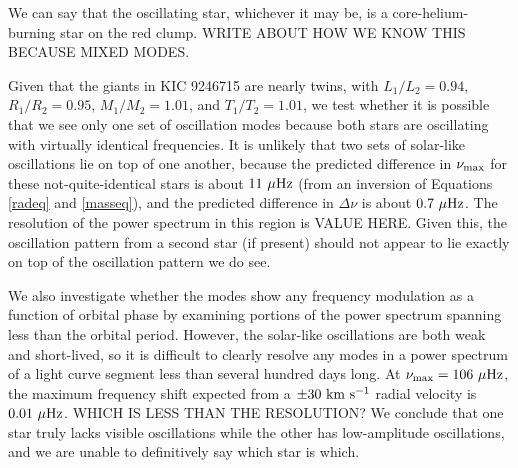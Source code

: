 We can say that the oscillating star, whichever it may be, is a core-helium-burning star on the red clump. WRITE ABOUT HOW WE KNOW THIS BECAUSE MIXED MODES. 

Given that the giants in KIC 9246715 are nearly twins, with $L_1/L_2 = 0.94$, $R_1/R_2 = 0.95$, $M_1/M_2 = 1.01$, and $T_1/T_2 = 1.01$, we test whether it is possible that we see only one set of oscillation modes because both stars are oscillating with virtually identical frequencies. It is unlikely that two sets of solar-like oscillations lie on top of one another, because the predicted difference in $\nu_{\rm{max}}$ for these not-quite-identical stars is about $11 \ \mu \rm{Hz}$ (from an inversion of Equations \ref{radeq} and \ref{masseq}), and the predicted difference in $\Delta \nu$ is about $0.7 \ \mu \rm{Hz}$. The resolution of the power spectrum in this region is VALUE HERE. Given this, the oscillation pattern from a second star (if present) should not appear to lie exactly on top of the oscillation pattern we do see.

We also investigate whether the modes show any frequency modulation as a function of orbital phase by examining portions of the power spectrum spanning less than the orbital period. However, the solar-like oscillations are both weak and short-lived, so it is difficult to clearly resolve any modes in a power spectrum of a light curve segment less than several hundred days long. At $\nu_{\rm{max}} = 106 \ \mu \rm{Hz}$, the maximum frequency shift expected from a $\pm 30 \ \rm{km} \ \rm{s}^{-1}$ radial velocity is $0.01 \ \mu \rm{Hz}$. WHICH IS LESS THAN THE RESOLUTION? We conclude that one star truly lacks visible oscillations while the other has low-amplitude oscillations, and we are unable to definitively say which star is which.